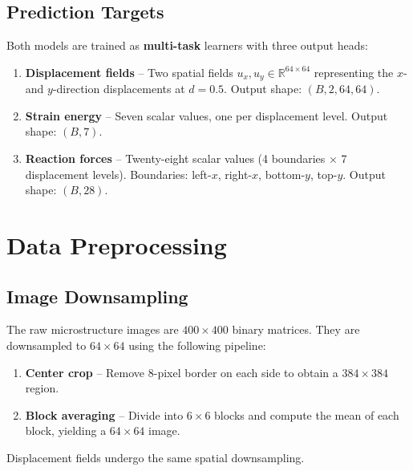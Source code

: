 \documentclass[11pt,a4paper]{article}
\begin{document}
\subsection{Prediction Targets}

Both models are trained as \textbf{multi-task} learners with three output heads:

\begin{enumerate}[leftmargin=2em]
    \item \textbf{Displacement fields} --
          Two spatial fields $u_x, u_y \in \mathbb{R}^{64 \times 64}$
          representing the $x$- and $y$-direction displacements at $d = 0.5$.
          Output shape: $(B, 2, 64, 64)$.

    \item \textbf{Strain energy} --
          Seven scalar values, one per displacement level.
          Output shape: $(B, 7)$.

    \item \textbf{Reaction forces} --
          Twenty-eight scalar values (4 boundaries $\times$ 7 displacement levels).
          Boundaries: left-$x$, right-$x$, bottom-$y$, top-$y$.
          Output shape: $(B, 28)$.
\end{enumerate}


\section{Data Preprocessing}
\label{sec:preprocessing}

\subsection{Image Downsampling}

The raw microstructure images are $400 \times 400$ binary matrices. They are
downsampled to $64 \times 64$ using the following pipeline:

\begin{enumerate}[leftmargin=2em]
    \item \textbf{Center crop} -- Remove 8-pixel border on each side to obtain
          a $384 \times 384$ region.
    \item \textbf{Block averaging} -- Divide into $6 \times 6$ blocks and
          compute the mean of each block, yielding a $64 \times 64$ image.
\end{enumerate}

Displacement fields undergo the same spatial downsampling.
\end{document}
